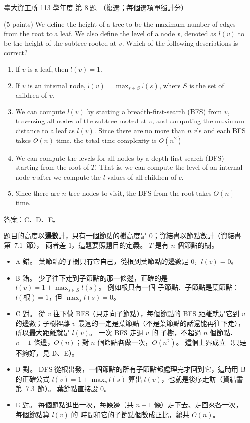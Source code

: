 \begin{pastexam}[label={px:ntu-113-dsa-08}]{臺大資工所 113 學年度 第 8 題}
（複選；每個選項單獨計分）

(5 points) We define the height of a tree to be the maximum number of edges from the root to a leaf.
We also define the level of a node $v$, denoted as $l(v)$ to be the height of the subtree rooted at
$v$. Which of the following descriptions is correct?
\begin{enumerate}[label=\Alph*.]
\item If $v$ is a leaf, then $l(v)=1$.
\item If $v$ is an internal node, $l(v)=\max_{s\in S}l(s)$, where $S$ is the set of children of $v$.
\item We can compute $l(v)$ by starting a breadth-first-search (BFS) from $v$, traversing all nodes
of the subtree rooted at $v$, and computing the maximum distance to a leaf as $l(v)$. Since there are
no more than $n$ $v$'s and each BFS takes $O(n)$ time, the total time complexity is $O(n^2)$
\item We can compute the levels for all nodes by a depth-first-search (DFS) starting from the root
of $T$. That is, we can compute the level of an internal node $v$ after we compute the $l$ values of
all children of $v$.
\item Since there are $n$ tree nodes to visit, the DFS from the root takes $O(n)$ time.
\end{enumerate}
\end{pastexam}

\begin{pastsoln}
答案：C、D、E。

題目的高度以\textbf{邊數}計，只有一個節點的樹高度是 $0$；資結書以節點數計（資結書第~7.1~節），
兩者差 $1$，這題要照題目的定義。 $T$ 是有 $n$ 個節點的樹。
\begin{itemize}
\item A 錯。 葉節點的子樹只有它自己，從根到葉節點的邊數是 $0$，$l(v) = 0$。
\item B 錯。 少了往下走到子節點的那一條邊，正確的是 $l(v) = 1 + \max_{s \in S} l(s)$。 例如根只有一個
子節點、子節點是葉節點：$l(\text{根}) = 1$，但 $\max_{s} l(s) = 0$。
\item C 對。 從 $v$ 往下做 BFS（只走向子節點），每個節點的 BFS 距離就是它到 $v$ 的邊數；子樹裡離 $v$
最遠的一定是葉節點（不是葉節點的話還能再往下走），所以最大距離就是 $l(v)$。 一次 BFS 走過 $v$ 的
子樹，不超過 $n$ 個節點、$n - 1$ 條邊，$O(n)$；對 $n$ 個節點各做一次，$O(n^2)$。 這個上界成立（只是
不夠好，見 D、E）。
\item D 對。 DFS 從根出發，一個節點的所有子節點都處理完才回到它，這時用 B 的正確公式
$l(v) = 1 + \max_{s} l(s)$ 算出 $l(v)$，也就是後序走訪（資結書第~7.3~節）。 葉節點直接設 $0$。
\item E 對。 每個節點進出一次，每條邊（共 $n - 1$ 條）走下去、走回來各一次，每個節點算 $l(v)$ 的
時間和它的子節點個數成正比，總共 $O(n)$。
\end{itemize}
\end{pastsoln}

